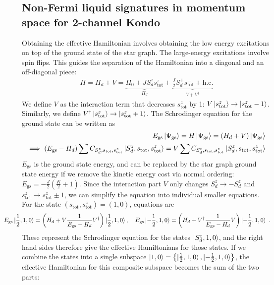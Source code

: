 \documentclass[12pt]{iopart}
\begin{document}
\subsection{Non-Fermi liquid signatures in momentum space for 2-channel Kondo}
Obtaining the effective Hamiltonian involves obtaining the low energy excitations on top of the ground state of the star graph. The large-energy excitations involve spin flips. This guides the separation of the Hamiltonian into a diagonal and an off-diagonal piece:
\begin{eqnarray}
	H = H_d + V = \underbrace{H_0 + J S_d^z s_\text{tot}^z}_{H_d} + \underbrace{\frac{J}{2}S_d^+ s_\text{tot}^- + \text{h.c.}}_{V + V^\dagger}
\end{eqnarray}
We define \(V\) as the interaction term that decreases \(s_\text{tot}^z\) by 1: \(V \ket{s_\text{tot}^z} \to \ket{s_\text{tot}^z - 1}\). Similarly, we define \(V^\dagger \ket{s_\text{tot}^z} \to \ket{s_\text{tot}^z + 1}\). The Schrodinger equation for the ground state can be written as
\begin{eqnarray}
	E_\text{gs}\ket{\Psi_\text{gs}} = H \ket{\Psi_\text{gs}} = \left(H_d + V\right)\ket{\Psi_\text{gs}} \nonumber\\
	\implies \left(E_\text{gs} - H_d\right)\sum C_{S_d^z, s_\text{tot},s_\text{tot}^z}\ket{S_d^z, s_\text{tot}, s_\text{tot}^z} = V\sum C_{S_d^z, s_\text{tot},s_\text{tot}^z}\ket{S_d^z, s_\text{tot}, s_\text{tot}^z}
\end{eqnarray}
\(E_\text{gs}\) is the ground state energy, and can be replaced by the star graph ground state energy if we remove the kinetic energy cost via normal ordering: \(E_\text{gs} = -\frac{J}{2}\left(\frac{K}{2}+1\right) \). Since the interaction part \(V\) only changes \(S_d^z \to -S_d^z\) and \(s^z_\text{tot} \to s^z_\text{tot} \pm 1\), we can simplify the equation into individual smaller equations. For the state \((s_\text{tot},s^z_\text{tot}) = (1,0)\), equations are
\begin{eqnarray}
	\label{eff_ham_Sdz_10}
	\hspace*{-30pt}E_\text{gs} \ket{\frac{1}{2}, 1, 0} = \left(H_d + V \frac{1}{E_\text{gs} - H_d}V^\dagger\right) \ket{\frac{1}{2}, 1, 0}, \quad E_\text{gs} \ket{-\frac{1}{2}, 1, 0} = \left(H_d + V^\dagger \frac{1}{E_\text{gs} - H_d} V\right) \ket{-\frac{1}{2}, 1, 0}~.
\end{eqnarray}
These represent the Schrodinger equation for the states \(\ket{S_d^z, 1, 0}\), and the right hand sides therefore give the effective Hamiltonians for those states. If we combine the states into a single subspace \(\ket{1,0}= \left\{\ket{\frac{1}{2}, 1, 0}, \ket{-\frac{1}{2}, 1, 0}\right\}\), the effective Hamiltonian for this composite subspace becomes the sum of the two parts:
\end{document}
